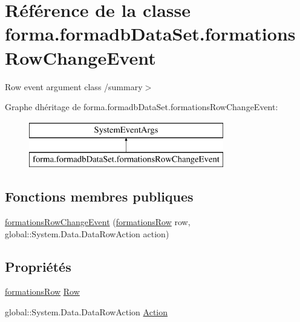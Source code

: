 \hypertarget{classforma_1_1formadb_data_set_1_1formations_row_change_event}{}\section{Référence de la classe forma.\+formadb\+Data\+Set.\+formations\+Row\+Change\+Event}
\label{classforma_1_1formadb_data_set_1_1formations_row_change_event}


Row event argument class /summary$>$  


Graphe d\textquotesingle{}héritage de forma.\+formadb\+Data\+Set.\+formations\+Row\+Change\+Event\+:\begin{figure}[H]
\begin{center}
\leavevmode
\includegraphics[height=2.000000cm]{classforma_1_1formadb_data_set_1_1formations_row_change_event}
\end{center}
\end{figure}
\subsection*{Fonctions membres publiques}
\begin{DoxyCompactItemize}
\item 
\hyperlink{classforma_1_1formadb_data_set_1_1formations_row_change_event_a261c402407067df0a00efcaffdec34af}{formations\+Row\+Change\+Event} (\hyperlink{classforma_1_1formadb_data_set_1_1formations_row}{formations\+Row} row, global\+::\+System.\+Data.\+Data\+Row\+Action action)
\end{DoxyCompactItemize}
\subsection*{Propriétés}
\begin{DoxyCompactItemize}
\item 
\hyperlink{classforma_1_1formadb_data_set_1_1formations_row}{formations\+Row} \hyperlink{classforma_1_1formadb_data_set_1_1formations_row_change_event_a3bea96189e1cd8f1ec3eead1b2ddfd82}{Row}
\item 
global\+::\+System.\+Data.\+Data\+Row\+Action \hyperlink{classforma_1_1formadb_data_set_1_1formations_row_change_event_a1dd5b3f30634e98c83ccb267dd8c193f}{Action}
\end{DoxyCompactItemize}


